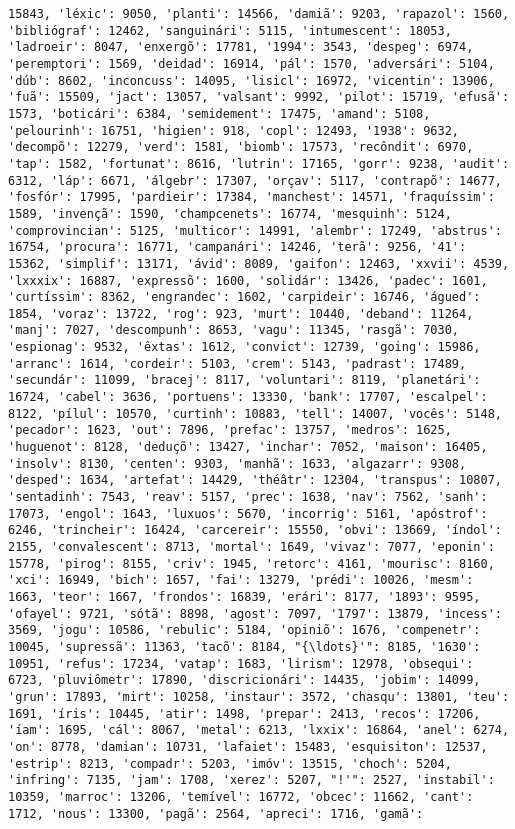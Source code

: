 \begin{Verbatim}[commandchars=\\\{\}]
15843, 'léxic': 9050, 'planti': 14566, 'damiã': 9203, 'rapazol': 1560, 'bibliógraf': 12462, 'sanguinári': 5115, 'intumescent': 18053, 'ladroeir': 8047, 'enxergõ': 17781, '1994': 3543, 'despeg': 6974, 'peremptori': 1569, 'deidad': 16914, 'pál': 1570, 'adversári': 5104, 'dúb': 8602, 'inconcuss': 14095, 'lisicl': 16972, 'vicentin': 13906, 'fuã': 15509, 'jact': 13057, 'valsant': 9992, 'pilot': 15719, 'efusã': 1573, 'boticári': 6384, 'semidement': 17475, 'amand': 5108, 'pelourinh': 16751, 'higien': 918, 'copl': 12493, '1938': 9632, 'decompõ': 12279, 'verd': 1581, 'biomb': 17573, 'recôndit': 6970, 'tap': 1582, 'fortunat': 8616, 'lutrin': 17165, 'gorr': 9238, 'audit': 6312, 'láp': 6671, 'álgebr': 17307, 'orçav': 5117, 'contrapõ': 14677, 'fosfór': 17995, 'pardieir': 17384, 'manchest': 14571, 'fraquíssim': 1589, 'invençã': 1590, 'champcenets': 16774, 'mesquinh': 5124, 'comprovincian': 5125, 'multicor': 14991, 'alembr': 17249, 'abstrus': 16754, 'procura': 16771, 'campanári': 14246, 'terã': 9256, '41': 15362, 'simplif': 13171, 'ávid': 8089, 'gaifon': 12463, 'xxvii': 4539, 'lxxxix': 16887, 'expressõ': 1600, 'solidár': 13426, 'padec': 1601, 'curtíssim': 8362, 'engrandec': 1602, 'carpideir': 16746, 'águed': 1854, 'voraz': 13722, 'rog': 923, 'murt': 10440, 'deband': 11264, 'manj': 7027, 'descompunh': 8653, 'vagu': 11345, 'rasgã': 7030, 'espionag': 9532, 'êxtas': 1612, 'convict': 12739, 'going': 15986, 'arranc': 1614, 'cordeir': 5103, 'crem': 5143, 'padrast': 17489, 'secundár': 11099, 'bracej': 8117, 'voluntari': 8119, 'planetári': 16724, 'cabel': 3636, 'portuens': 13330, 'bank': 17707, 'escalpel': 8122, 'pílul': 10570, 'curtinh': 10883, 'tell': 14007, 'vocês': 5148, 'pecador': 1623, 'out': 7896, 'prefac': 13757, 'medros': 1625, 'huguenot': 8128, 'deduçõ': 13427, 'inchar': 7052, 'maison': 16405, 'insolv': 8130, 'centen': 9303, 'manhã': 1633, 'algazarr': 9308, 'desped': 1634, 'artefat': 14429, 'théâtr': 12304, 'transpus': 10807, 'sentadinh': 7543, 'reav': 5157, 'prec': 1638, 'nav': 7562, 'sanh': 17073, 'engol': 1643, 'luxuos': 5670, 'incorrig': 5161, 'apóstrof': 6246, 'trincheir': 16424, 'carcereir': 15550, 'obvi': 13669, 'índol': 2155, 'convalescent': 8713, 'mortal': 1649, 'vivaz': 7077, 'eponin': 15778, 'pirog': 8155, 'criv': 1945, 'retorc': 4161, 'mourisc': 8160, 'xci': 16949, 'bich': 1657, 'fai': 13279, 'prédi': 10026, 'mesm': 1663, 'teor': 1667, 'frondos': 16839, 'erári': 8177, '1893': 9595, 'ofayel': 9721, 'sótã': 8898, 'agost': 7097, '1797': 13879, 'incess': 3569, 'jogu': 10586, 'rebulic': 5184, 'opiniõ': 1676, 'compenetr': 10045, 'supressã': 11363, 'tacõ': 8184, "{\ldots}'": 8185, '1630': 10951, 'refus': 17234, 'vatap': 1683, 'lirism': 12978, 'obsequi': 6723, 'pluviômetr': 17890, 'discricionári': 14435, 'jobim': 14099, 'grun': 17893, 'mirt': 10258, 'instaur': 3572, 'chasqu': 13801, 'teu': 1691, 'íris': 10445, 'atir': 1498, 'prepar': 2413, 'recos': 17206, 'íam': 1695, 'cál': 8067, 'metal': 6213, 'lxxix': 16864, 'anel': 6274, 'on': 8778, 'damian': 10731, 'lafaiet': 15483, 'esquisiton': 12537, 'estrip': 8213, 'compadr': 5203, 'imóv': 13515, 'choch': 5204, 'infring': 7135, 'jam': 1708, 'xerez': 5207, "!'": 2527, 'instabil': 10359, 'marroc': 13206, 'temível': 16772, 'obcec': 11662, 'cant': 1712, 'nous': 13300, 'pagã': 2564, 'apreci': 1716, 'gamã': 
\end{Verbatim}

